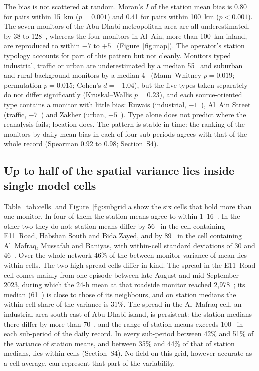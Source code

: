The bias is not scattered at random. Moran's $I$ of the station mean bias is 0.80 for pairs
within 15~km ($p=0.001$) and 0.41 for pairs within 100~km ($p<0.001$). The seven monitors of the
Abu Dhabi metropolitan area are all underestimated, by 38 to 128~\ugm{}, whereas the four
monitors in Al~Ain, more than 100~km inland, are reproduced to within $-7$ to $+5$~\ugm{}
(Figure~\ref{fig:map}). The operator's station typology accounts for part of this pattern but not
cleanly. Monitors typed industrial, traffic or urban are underestimated by a median 55~\ugm{} and
suburban and rural-background monitors by a median 4~\ugm{} (Mann--Whitney $p=0.019$; permutation
$p=0.015$; Cohen's $d=-1.04$), but the five types taken separately do not differ significantly
(Kruskal--Wallis $p=0.23$), and each source-oriented type contains a monitor with little bias:
Ruwais (industrial, $-1$~\ugm{}), Al~Ain Street (traffic, $-7$~\ugm{}) and Zakher (urban,
$+5$~\ugm{}). Type alone does not predict where the reanalysis fails; location does. The pattern
is stable in time: the ranking of the monitors by daily mean bias in each of four sub-periods
agrees with that of the whole record (Spearman 0.92 to 0.98; Section~S4).

\subsection{Up to half of the spatial variance lies inside single model cells}
\label{sec:res-subgrid}

Table~\ref{tab:cells} and Figure~\ref{fig:subgrid}a show the six cells that hold more than one
monitor. In four of them the station means agree to within 1--16~\ugm{}. In the other two they do
not: station means differ by 56~\ugm{} in the cell containing E11~Road, Habshan South and Bida
Zayed, and by 89~\ugm{} in the cell containing Al~Mafraq, Mussafah and Baniyas, with within-cell
standard deviations of 30 and 46~\ugm{}. Over the whole network 46\% of the between-monitor
variance of mean \pmten{} lies within cells. The two high-spread cells differ in kind. The spread
in the E11~Road cell comes mainly from one episode between late August and mid-September 2023,
during which the 24-h mean at that roadside monitor reached 2,978~\ugm{}; its median (61~\ugm{})
is close to those of its neighbours, and on station medians the within-cell share of the variance
is 31\%. The spread in the Al~Mafraq cell, an industrial area south-east of Abu Dhabi island, is
persistent: the station medians there differ by more than 70~\ugm{}, and the range of station
means exceeds 100~\ugm{} in each sub-period of the daily record. In every sub-period between 42\%
and 51\% of the variance of station means, and between 35\% and 44\% of that of station medians,
lies within cells (Section~S4). No field on this grid, however accurate as a cell average, can
represent that part of the variability.

